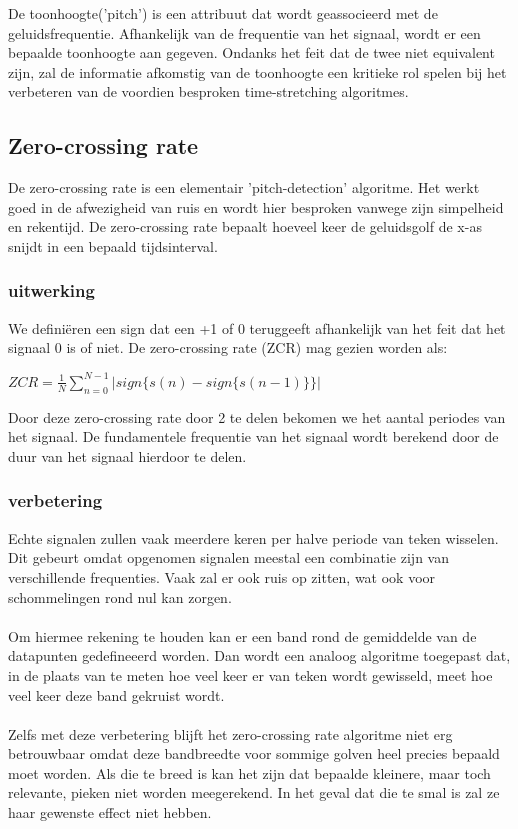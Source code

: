 \documentclass[12pt]{report}
\begin{document}
De toonhoogte('pitch') is een attribuut dat wordt geassocieerd met de geluidsfrequentie. Afhankelijk van de frequentie van het signaal, wordt er een bepaalde toonhoogte aan gegeven. Ondanks het feit dat de twee niet equivalent zijn, zal de informatie afkomstig van de toonhoogte een kritieke rol spelen bij het 
verbeteren van de voordien besproken time-stretching algoritmes.

\subsection{Zero-crossing rate}

De zero-crossing rate is een elementair 'pitch-detection' algoritme. Het werkt goed in de afwezigheid van ruis en wordt hier besproken vanwege zijn simpelheid en rekentijd. De zero-crossing rate bepaalt hoeveel keer de geluidsgolf de x-as snijdt in een bepaald tijdsinterval.

\subsubsection{uitwerking}

We definiëren een sign {} dat een +1 of 0 teruggeeft afhankelijk van het feit dat het signaal 0 is of niet. De zero-crossing rate (ZCR) mag gezien worden als:
\begin{center}
$ZCR=\frac{1}{N} \sum\limits_{n=0}^{N-1} |sign\{s(n)-sign\{s(n-1)\}\}|$
\end{center}

Door deze zero-crossing rate door 2 te delen bekomen we het aantal periodes van het signaal. De fundamentele frequentie van het signaal wordt berekend door de duur van het signaal hierdoor te delen.

\subsubsection{verbetering}

Echte signalen zullen vaak meerdere keren per halve periode van teken wisselen. Dit gebeurt omdat opgenomen signalen meestal een combinatie zijn van verschillende frequenties. Vaak zal er ook ruis op zitten, wat ook voor schommelingen rond nul kan zorgen.\\
\\
Om hiermee rekening te houden kan er een band rond de gemiddelde van de datapunten gedefineeerd worden. Dan wordt een analoog algoritme toegepast dat, in de plaats van te meten hoe veel keer er van teken wordt gewisseld, meet hoe veel keer deze band gekruist wordt.\\
\\
Zelfs met deze verbetering blijft het zero-crossing rate algoritme niet erg betrouwbaar omdat deze bandbreedte voor sommige golven heel precies bepaald moet worden. Als die te breed is kan het zijn dat bepaalde kleinere, maar toch relevante, pieken niet worden meegerekend. In het geval dat die te smal is zal ze haar gewenste effect niet hebben.
\end{document}
